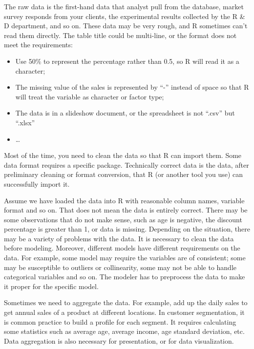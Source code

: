 \documentclass[
]{article}
\providecommand{\tightlist}{%
  \setlength{\itemsep}{0pt}\setlength{\parskip}{0pt}}
\begin{document}
The raw data is the first-hand data that analyst pull from the database,
market survey responds from your clients, the experimental results
collected by the R \& D department, and so on. These data may be very
rough, and R sometimes can't read them directly. The table title could
be multi-line, or the format does not meet the requirements:

\begin{itemize}
\tightlist
\item
  Use 50\% to represent the percentage rather than 0.5, so R will read
  it as a character;
\item
  The missing value of the sales is represented by ``-'' instead of
  space so that R will treat the variable as character or factor type;
\item
  The data is in a slideshow document, or the spreadsheet is not
  ``.csv'' but ``.xlsx''
\item
  \ldots{}
\end{itemize}

Most of the time, you need to clean the data so that R can import them.
Some data format requires a specific package. Technically correct data
is the data, after preliminary cleaning or format conversion, that R (or
another tool you use) can successfully import it.

Assume we have loaded the data into R with reasonable column names,
variable format and so on. That does not mean the data is entirely
correct. There may be some observations that do not make sense, such as
age is negative, the discount percentage is greater than 1, or data is
missing. Depending on the situation, there may be a variety of problems
with the data. It is necessary to clean the data before modeling.
Moreover, different models have different requirements on the data. For
example, some model may require the variables are of consistent; some
may be susceptible to outliers or collinearity, some may not be able to
handle categorical variables and so on. The modeler has to preprocess
the data to make it proper for the specific model.

Sometimes we need to aggregate the data. For example, add up the daily
sales to get annual sales of a product at different locations. In
customer segmentation, it is common practice to build a profile for each
segment. It requires calculating some statistics such as average age,
average income, age standard deviation, etc. Data aggregation is also
necessary for presentation, or for data visualization.
\end{document}
